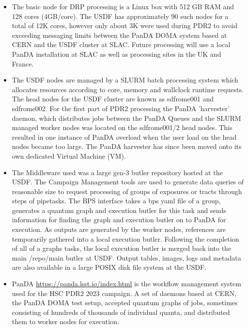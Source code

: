 \begin{itemize}

\item The basic node for DRP processing is a Linux box with 512 GB RAM and
128 cores (4GB/core).  The USDF has approximately 90 such nodes for
a total of 12K cores, however only about 3K were used during PDR2 to avoid
exceeding messaging limits between the PanDA DOMA system based at CERN 
and the USDF cluster at SLAC.  Future processing will use a local
PanDA installation at SLAC as well as processing sites in the UK and France.  
		
\item The USDF nodes are managed by a SLURM batch
processing system which allocates resources according to core, memory and 
wallclock runtime requests.  The head nodes for the USDF cluster are 
known as sdfrome001 and sdfrome002.  For the first part of PDR2
processing the PanDA 'harvester' daemon, which distributes jobs between the
PanDA Queues and the SLURM managed worker nodes was located on the sdfrome001/2
head nodes.  This resulted in one instance of PanDA overload when the user load
on the head nodes became too large.  The PanDA harvester has since been
moved onto its own dedicated Virtual Machine (VM).

\item The Middleware used was a large gen-3 butler repository hosted
at the USDF.   The Campaign Management tools are used to 
generate data queries of reasonable size to 
request processing of groups of exposures or tracts
through steps of pipetasks.  The BPS interface
takes a bps yaml file of a group, generates a
quantum graph and execution butler for this
task and sends information for finding the graph
and execution butler on to PanDA for execution.
As outputs are generated by the worker nodes, references are 
temporarily gathered into a local execution butler.
Following the completion of all of a graphs tasks,
the local execution butler is merged back into
the main /repo/main butler at USDF.
Output tables, images, logs and metadata are 
also available in a large POSIX disk file system
at the USDF.

\item PanDA \url{https://panda.lsst.io/index.html} is the workflow 
management system used for the HSC PDR2 2023 campaign.
A set of daemons based at CERN, the PanDA DOMA test setup, accepted quantum
graphs of jobs,  sometimes consisting of hundreds of thousands of individual
quanta, and distributed them to worker nodes for execution.
\end{itemize}

